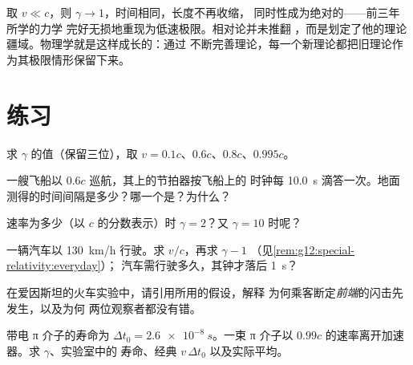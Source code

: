 \begin{remark}[牛顿并没有错]\label{rem:g12:special-relativity:newton}
取 $v \ll c$，则 $\gamma \to 1$，时间相同，长度不再收缩，
同时性成为绝对的——前三年所学的力学
完好无损地重现为低速极限。相对论并未推翻
，而是划定了他的理论疆域。物理学就是这样成长的：通过
不断完善理论，每一个新理论都把旧理论作为其极限情形保留下来。
\end{remark}

\section{练习}

\begin{exercise}[$\star$]\label{exo:g12:special-relativity:1}
求 $\gamma$ 的值（保留三位），取 $v = 0.1c$、$0.6c$、$0.8c$、$0.995c$。
\end{exercise}

\begin{exercise}[$\star$]\label{exo:g12:special-relativity:2}
一艘飞船以 $0.6c$ 巡航，其上的节拍器按飞船上的
时钟每 \qty{10.0}{s} 滴答一次。地面测得的时间间隔是多少？哪一个是？为什么？
\end{exercise}

\begin{exercise}[$\star$]\label{exo:g12:special-relativity:3}
速率为多少（以 $c$ 的分数表示）时 $\gamma = 2$？又 $\gamma = 10$ 时呢？
\end{exercise}

\begin{exercise}[$\star$]\label{exo:g12:special-relativity:4}
一辆汽车以 \qty{130}{km/h} 行驶。求 $v/c$，再求 $\gamma - 1$
（见\cref{rem:g12:special-relativity:everyday}）；
汽车需行驶多久，其钟才落后 \qty{1}{s}？
\end{exercise}

\begin{exercise}[$\star$]\label{exo:g12:special-relativity:5}
在爱因斯坦的火车实验中，请引用所用的假设，解释
为何乘客断定\emph{前端}的闪击先发生，以及为何
两位观察者都没有错。
\end{exercise}

\begin{exercise}[$\star\star$]\label{exo:g12:special-relativity:6}
带电 π 介子的寿命为 $\Delta t_0 = \qty{2.6e-8}{s}$。一束
π 介子以 $0.99c$ 的速率离开加速器。求 $\gamma$、实验室中的
寿命、经典 $v\,\Delta t_0$ 以及实际平均。
\end{exercise}

